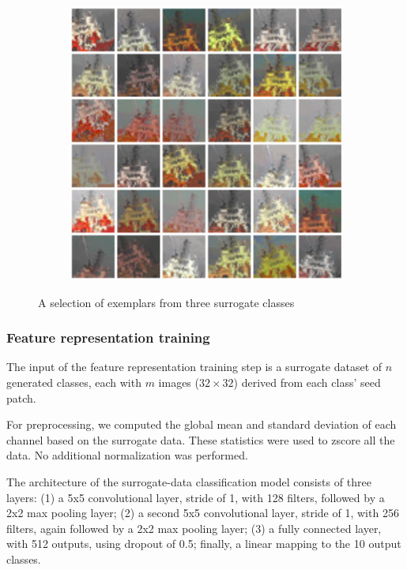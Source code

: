 \documentclass{article} %
\begin{document}
\begin{figure}[h]
\begin{subfigure}{0.25\textwidth}
\end{subfigure}
\begin{subfigure}{0.25\textwidth}
  \centering
  \includegraphics[width=\textwidth]{figs/patch_noflip_boattop.png}
\end{subfigure}
\caption{A selection of exemplars from three surrogate classes}
\label{figpatch}
\end{figure}

\subsubsection{Feature representation training}
The input of the feature representation training step is a surrogate dataset of $n$ generated classes, each with $m$ images ($32\times32$) derived from each class' seed patch.

For preprocessing, we computed the global mean and standard deviation of each channel based on the surrogate data. These statistics were used to zscore all the data. No additional normalization was performed.

The architecture of the surrogate-data classification model consists of three layers: (1) a 5x5 convolutional layer, stride of 1, with 128 filters, followed by a 2x2 max pooling layer; (2) a second 5x5 convolutional layer, stride of 1, with 256 filters, again followed by a 2x2 max pooling layer; (3) a fully connected layer, with 512 outputs, using dropout of 0.5; finally, a linear mapping to the 10 output classes.
\end{document}
